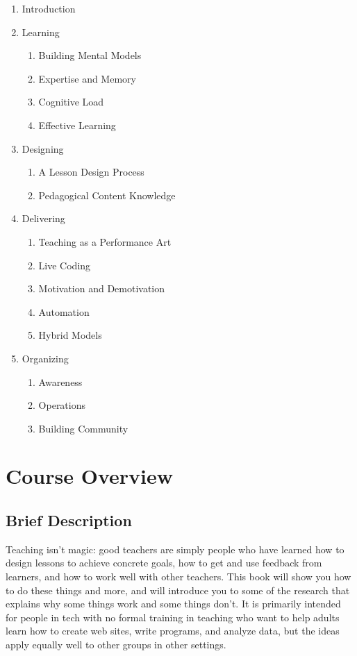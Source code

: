 \begin{enumerate}
\item
  Introduction
\item
  Learning

  \begin{enumerate}
  \item
    Building Mental Models
  \item
    Expertise and Memory
  \item
    Cognitive Load
  \item
    Effective Learning
  \end{enumerate}
\item
  Designing

  \begin{enumerate}
  \item
    A Lesson Design Process
  \item
    Pedagogical Content Knowledge
  \end{enumerate}
\item
  Delivering

  \begin{enumerate}
  \item
    Teaching as a Performance Art
  \item
    Live Coding
  \item
    Motivation and Demotivation
  \item
    Automation
  \item
    Hybrid Models
  \end{enumerate}
\item
  Organizing

  \begin{enumerate}
  \item
    Awareness
  \item
    Operations
  \item
    Building Community
  \end{enumerate}
\end{enumerate}

\section{Course Overview}\label{course-overview}

\subsection{Brief Description}\label{brief-description}

Teaching isn't magic: good teachers are simply people who have learned
how to design lessons to achieve concrete goals, how to get and use
feedback from learners, and how to work well with other teachers. This
book will show you how to do these things and more, and will introduce
you to some of the research that explains why some things work and some
things don't. It is primarily intended for people in tech with no formal
training in teaching who want to help adults learn how to create web
sites, write programs, and analyze data, but the ideas apply equally
well to other groups in other settings.

